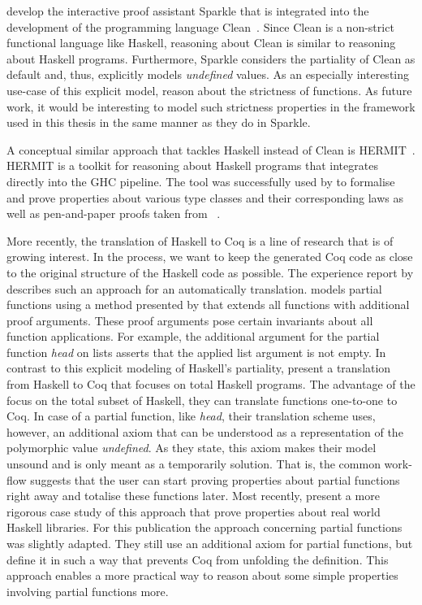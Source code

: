 \citet{demol2002theorem} develop the interactive proof assistant
Sparkle that is integrated into the development of  the programming
language Clean~\citep{brus1987clean}.
Since Clean is a non-strict functional language like Haskell,
reasoning about Clean is similar to reasoning about Haskell programs.
Furthermore, Sparkle considers the partiality of Clean as default and,
thus, explicitly models \emph{undefined} values.
As an especially interesting use-case of this explicit model,
\citet{vaneekelen2006proof} reason about the strictness of functions.
As future work, it would be interesting to model such strictness properties in the
framework used in this thesis in the same manner as they do in Sparkle.

A conceptual similar approach that tackles Haskell instead of Clean is
HERMIT~\citep{farmer2015reasoning}.
HERMIT is a toolkit for reasoning about Haskell programs that integrates directly
into the GHC pipeline.
The tool was successfully used by \citeauthor{farmer2015reasoning} to
formalise and prove properties about various type classes and their
corresponding laws as well as pen-and-paper proofs taken from
~\citep{bird2010pearls}.

More recently, the translation of Haskell to Coq is a line of research that is of
growing interest.
In the process, we want to keep the generated Coq code as close to the
original structure of the Haskell code as possible.
The experience report by \citet{dijkstra2012experimentation}
describes such an approach for an automatically translation.
\citeauthor{dijkstra2012experimentation} models partial functions
using a method presented by \citet{bove2007computation} that extends
all functions with additional proof arguments.
These proof arguments pose certain invariants about all function
applications.
For example, the additional argument for the partial function
\emph{head} on lists asserts that the applied list argument is not
empty.
In contrast to this explicit modeling of Haskell's partiality,
\citet{spector-zabusky2018total} present a translation from Haskell to
Coq that focuses on total Haskell programs.
The advantage of the focus on the total subset of Haskell,
they can translate functions one-to-one to Coq.
In case of a partial function, like \emph{head}, their translation
scheme uses, however, an additional axiom that can be understood as a
representation of the polymorphic value \emph{undefined}.
As they state, this axiom makes their model unsound and is only meant
as a temporarily solution.
That is, the common work-flow suggests that the user can start proving
properties about partial functions right away and totalise these
functions later.
Most recently, \citet{breitner2018ready} present a more rigorous case
study of this approach that prove properties about real world
Haskell libraries.
For this publication the approach concerning partial functions was
slightly adapted.
They still use an additional axiom for partial functions, but define
it in such a way that prevents Coq from unfolding the definition.
This approach enables a more practical way to reason about some simple
properties involving partial functions more.

